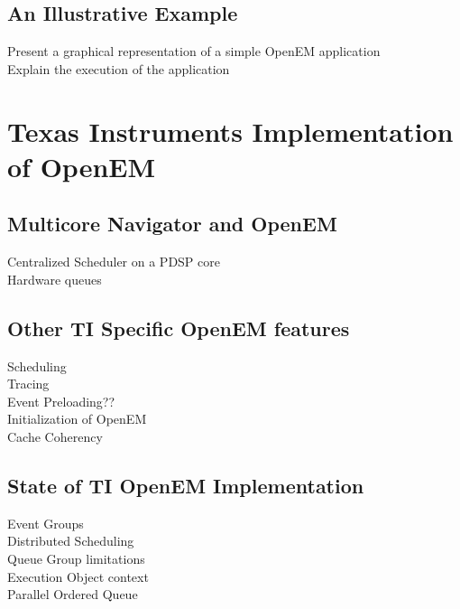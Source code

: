 \subsection{An Illustrative Example}
\label{subsec:example}
Present a graphical representation of a simple OpenEM application\\
Explain the execution of the application

\section{Texas Instruments Implementation of OpenEM}
\label{sec:tiopenem}
\subsection{Multicore Navigator and OpenEM}
Centralized Scheduler on a PDSP core\\
Hardware queues\\
\subsection{Other TI Specific OpenEM features}
Scheduling\\
Tracing\\
Event Preloading??\\
Initialization of OpenEM\\
Cache Coherency
\subsection{State of TI OpenEM Implementation}
Event Groups\\
Distributed Scheduling\\
Queue Group limitations\\
Execution Object context\\
Parallel Ordered Queue\\



